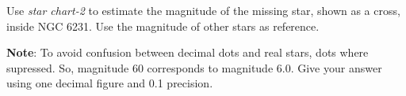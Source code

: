 Use \emph{star chart-2} to estimate the magnitude of the missing star, shown
as a cross, inside NGC 6231. Use the magnitude of other stars as reference.

\textbf{Note}: To avoid confusion between decimal dots and real stars, dots
where supressed. So, magnitude 60 corresponds to magnitude 6.0. Give your
answer using one decimal figure and 0.1 precision.

